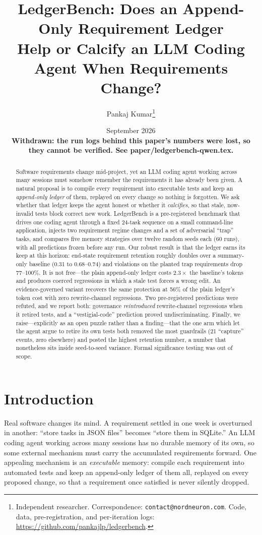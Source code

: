 \documentclass[11pt]{article}
\title{\textbf{LedgerBench: Does an Append-Only Requirement Ledger\\
Help or Calcify an LLM Coding Agent When Requirements Change?}}
\author{Pankaj Kumar\thanks{Independent researcher.
Correspondence: \texttt{contact@nordneuron.com}.
Code, data, pre-registration, and per-iteration logs:
\url{https://github.com/pankajlp/ledgerbench}.}}
\date{September 2026\\[4pt]\textbf{Withdrawn: the run logs behind this paper's numbers were lost, so
they cannot be verified. See paper/ledgerbench-qwen.tex.}}
\begin{document}
\maketitle

\begin{abstract}
Software requirements change mid-project, yet an LLM coding agent working
across many sessions must somehow remember the requirements it has already
been given. A natural proposal is to compile every requirement into
executable tests and keep an \emph{append-only ledger} of them, replayed on
every change so nothing is forgotten. We ask whether that ledger keeps the
agent honest or whether it \emph{calcifies}, so that stale, now-invalid
tests block correct new work. LedgerBench is a pre-registered benchmark that
drives one coding agent through a fixed 24-task sequence on a small
command-line application, injects two requirement regime changes and a set
of adversarial ``trap'' tasks, and compares five memory strategies over
twelve random seeds each (60 runs), with all predictions frozen before any
run. Our robust result is that the ledger earns its keep at this horizon:
end-state requirement retention roughly doubles over a summary-only baseline
(0.31 to 0.68--0.74) and violations on the planted trap requirements drop
77--100\%. It is not free---the plain append-only ledger costs $2.3\times$
the baseline's tokens and produces coerced regressions in which a stale test
forces a wrong edit. An evidence-governed variant recovers the same
protection at 56\% of the plain ledger's token cost with zero rewrite-channel
regressions. Two pre-registered predictions were refuted, and we report both:
governance \emph{reintroduced} rewrite-channel regressions when it retired
tests, and a ``vestigial-code'' prediction proved undiscriminating. Finally,
we raise---explicitly as an open puzzle rather than a finding---that the one
arm which let the agent argue to retire its own tests both removed the most
guardrails (21 ``capture'' events, zero elsewhere) and posted the highest
retention number, a number that nonetheless sits inside seed-to-seed
variance. Formal significance testing was out of scope.
\end{abstract}

\section{Introduction}

Real software changes its mind. A requirement settled in one week is
overturned in another: ``store tasks in JSON files'' becomes ``store them in
SQLite.'' An LLM coding agent working across many sessions has no durable
memory of its own, so some external mechanism must carry the accumulated
requirements forward. One appealing mechanism is an \emph{executable}
memory: compile each requirement into automated tests and keep an
append-only ledger of them all, replayed on every proposed change, so that a
requirement once satisfied is never silently dropped.
\end{document}
